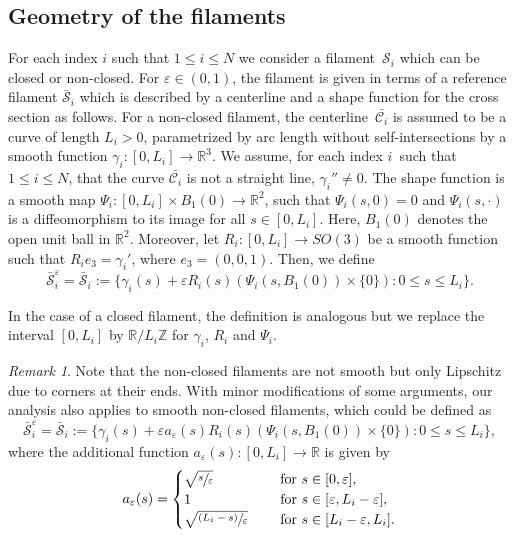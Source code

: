 \documentclass[JEP,XML,SOM,Unicode, NoEqCountersInSection,NoFloatCountersInSection,published]{cedram}
\newcommand{\psfrac}[2]{\sfrac{(#1)}{#2}}
\newcommand{\R}{\mathbb{R}}
\newcommand{\Z}{\mathbb{Z}}
\let\eps\varepsilon
\theoremstyle{definition}
\theoremstyle{remark}
\newtheorem{remark}[thm]{Remark}
\begin{document}
\subsection{Geometry of the filaments}
For each index $i$ such that $ 1\leq i \leq N$
we consider a filament~$\mathcal S_i$ which can be closed or non-closed.
For $\eps \in (0,1)$, the filament is given in terms of a reference filament $\bar{\mathcal S}_i$ which is described by a centerline and a shape function for the cross section as follows.
For a non-closed filament, the centerline~$\bar {\mathcal C_i}$ is assumed to be a curve of length $L_i >0$, parametrized by arc length without self-intersections by a smooth function $\gamma_i \colon [0,L_i] \to \R^3$.
We assume, for each index $i$~such that $1\leq i \leq N$, that the curve $\bar {\mathcal C_i}$
is not a straight line, \ie $\gamma_i'' \neq 0$.
The shape function is a smooth map $\Psi_i \colon [0,L_i] \times B_1(0) \to \R^2$, such that $\Psi_i(s,0) = 0$ and
$\Psi_i(s,\cdot)$ is a diffeomorphism to its image for all $s \in [0,L_i]$. Here, $B_1(0)$ denotes the open unit ball in $\R^2$. Moreover, let $R_i \colon [0,L_i] \to SO(3)$ be a smooth function such that $R_i e_3 = \gamma_i'$, where $e_3=(0,0,1)$.
Then, we define
\begin{equation} \label{def:S^eps}
{\bar{ \mathcal S}_i^\eps}= \bar{ \mathcal S}_i := \{ \gamma_i(s) + \eps R_i(s)(\Psi_i(s,B_1(0)) \times \{0\}) : 0 \leq s \leq L_i \}.
\end{equation}

In the case of a closed filament, the definition is analogous but we replace the interval $[0,L_i]$ by $\R/L_i \Z$ for $\gamma_i$, $R_i$ and $ \Psi_i$.

\begin{remark} \label{rem:nonclosed.smooth}
Note that the non-closed filaments are not smooth but only Lipschitz due to corners at their ends. With minor modifications of some arguments, our analysis also applies to smooth non-closed filaments, which could be defined as
\begin{equation}
{\bar{ \mathcal S}_i^\eps} = \bar{ \mathcal S}_i := \{ \gamma_i(s) + \eps a_\eps(s) R_i(s)(\Psi_i(s,B_1(0)) \times \{0\}) : 0 \leq s \leq L_i \},
\end{equation}
where the additional function $a_\eps(s) : [0,L_i] \to \R$ is given by
\begin{equation}
a_\eps(s) = \begin{cases}
\sqrt{\sfrac s \eps} &\quad \text { for } s \in [0,\eps], \\
1 &\quad \text { for } s \in [\eps, L_i - \eps], \\
\sqrt{\psfrac{L_i - s}{\eps}} & \quad \text{ for } s \in [L_i-\eps,L_i].
\end{cases}
\end{equation}
\end{remark}
\end{document}
